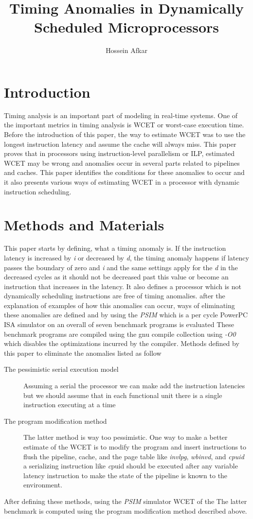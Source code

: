 \documentclass[a4paper, 11pt]{article}
\title{Timing Anomalies in Dynamically Scheduled Microprocessors}
\author{Hossein Afkar}
\begin{document}
\maketitle

\section{Introduction}
Timing analysis is an important part of modeling in real-time systems.
One of the important metrics in timing analysis is WCET or worst-case execution
time. Before the introduction of this paper, the way to estimate WCET was to
use the longest instruction latency and assume the cache will always miss.
This paper proves that in processors using instruction-level parallelism or
ILP, estimated WCET may be wrong and anomalies occur in several parts related
to pipelines and caches.
This paper identifies the conditions for these anomalies to occur and it also
presents various ways of estimating WCET in a processor with dynamic
instruction scheduling.


\section{Methods and Materials}
This paper starts by defining, what a timing anomaly is. If the instruction
latency is increased by \textit i or decreased by \textit d, the timing anomaly
happens if latency passes the boundary of zero and \textit i and the same
settings apply for the \textit d in the decreased cycles as it should not be
decreased past this value or become an instruction that increases in the
latency.
It also defines a processor which is not dynamically scheduling
instructions are free of timing anomalies.
after the explanation of examples of how this anomalies can occur, ways of
eliminating these anomalies are defined and by using the \textit{PSIM} which is
a per cycle PowerPC ISA simulator on an overall of seven benchmark programs
is evaluated
These benchmark programs are compiled using the gnu compile collection
using \textit{-O0} which disables the optimizations incurred by the compiler.
Methods defined by this paper to eliminate the anomalies listed as
follow
\begin{description}
    \item[The pessimistic serial execution model] Assuming a serial
    the processor we can make add the instruction latencies but we should
    assume that in each functional unit there is a single instruction
    executing at a time
    \item[The program modification method] The latter method is way too
    pessimistic. One way to make a better estimate of the WCET is to modify
    the program and insert instructions to flush the pipeline, cache, and
    the page table like \textit{invlpg}, \textit{wbinvd}, and
    \textit{cpuid} a serializing instruction like \textit cpuid should be
    executed after any variable latency instruction to make the state of 
    the pipeline is known to the environment.
\end{description}
After defining these methods, using the \textit{PSIM} simulator WCET of the
The latter benchmark is computed using the program modification method described
above.
\end{document}
